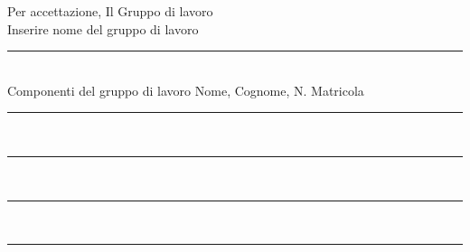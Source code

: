 \documentclass[11pt,a4paper,roman]{moderncv}
\begin{document}
Per accettazione,
Il Gruppo di lavoro\\[1.5em]

Inserire nome del gruppo di lavoro \\[2.5em]
\rule{10cm}{0.7pt}\\[2.5em]


Componenti del gruppo di lavoro
Nome, Cognome, N. Matricola\\[2.5em]

\rule{12cm}{0.7pt}\\[2.5em]

\rule{12cm}{0.7pt}\\[2.5em]

\rule{12cm}{0.7pt}\\[2.5em]

\rule{12cm}{0.7pt}\\[2.5em]
\end{document}
